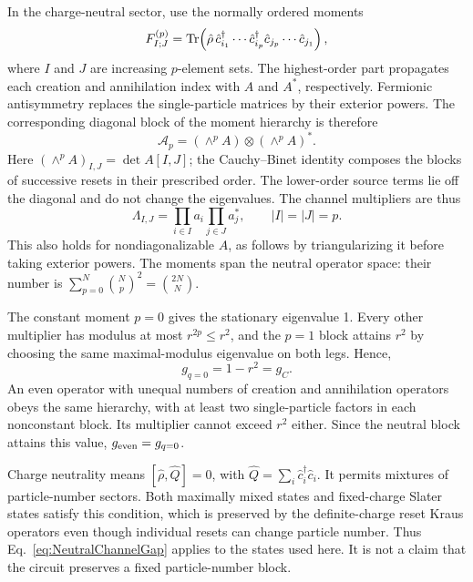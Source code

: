 \documentclass[aps,prb,10pt,twocolumn,superscriptaddress,longbibliography,floatfix]{revtex4-2}
\begin{document}
{In the charge-neutral sector, use the normally ordered moments
\begin{equation}
    F^{(p)}_{I;J}=\Tr\!\left(\hat\rho\,
    \hat c_{i_1}^\dagger\cdots\hat c_{i_p}^\dagger
    \hat c_{j_p}\cdots\hat c_{j_1}\right),
    \label{eq:NeutralMomentHierarchy}
\end{equation}
where $I$ and $J$ are increasing $p$-element sets. The highest-order part propagates each creation and annihilation index with $A$ and $A^*$, respectively. Fermionic antisymmetry replaces the single-particle matrices by their exterior powers. The corresponding diagonal block of the moment hierarchy is therefore
\begin{equation}
    \mathcal A_p=(\wedge^p A)\otimes(\wedge^p A)^*.
    \label{eq:ExteriorPowerChannel}
\end{equation}
Here $(\wedge^p A)_{I,J}=\det A[I,J]$; the Cauchy--Binet identity composes the blocks of successive resets in their prescribed order. The lower-order source terms lie off the diagonal and do not change the eigenvalues. The channel multipliers are thus
\begin{equation}
    \Lambda_{I,J}=\prod_{i\in I}a_i\prod_{j\in J}a_j^*,
    \qquad |I|=|J|=p.
    \label{eq:NeutralChannelSpectrum}
\end{equation}
This also holds for nondiagonalizable $A$, as follows by triangularizing it before taking exterior powers. The moments span the neutral operator space: their number is $\sum_{p=0}^N\binom{N}{p}^2=\binom{2N}{N}$.

The constant moment $p=0$ gives the stationary eigenvalue 1. Every other multiplier has modulus at most $r^{2p}\leq r^2$, and the $p=1$ block attains $r^2$ by choosing the same maximal-modulus eigenvalue on both legs. Hence,
\begin{equation}
    g_{q=0}=1-r^2=g_C.
    \label{eq:NeutralChannelGap}
\end{equation}
An even operator with unequal numbers of creation and annihilation operators obeys the same hierarchy, with at least two single-particle factors in each nonconstant block. Its multiplier cannot exceed $r^2$ either. Since the neutral block attains this value, $g_{\rm even}=g_{q=0}$.

Charge neutrality means $[\hat\rho,\hat Q]=0$, with $\hat Q=\sum_i\hat c_i^\dagger\hat c_i$. It permits mixtures of particle-number sectors. Both maximally mixed states and fixed-charge Slater states satisfy this condition, which is preserved by the definite-charge reset Kraus operators even though individual resets can change particle number. Thus Eq.~\eqref{eq:NeutralChannelGap} applies to the states used here. It is not a claim that the circuit preserves a fixed particle-number block.

}
\end{document}
